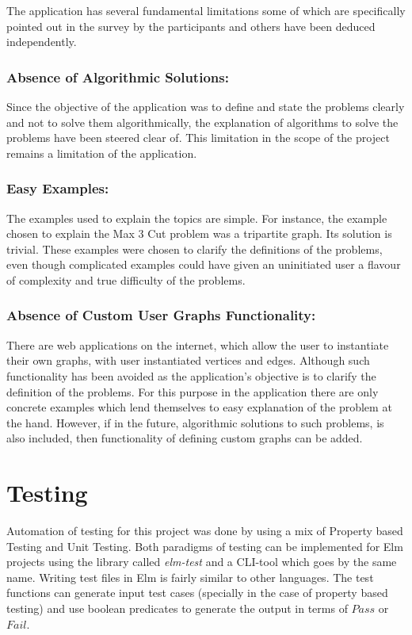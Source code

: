 The application has several fundamental limitations some of which are specifically pointed
out in the survey by the participants and others have been deduced
independently.

\subsubsection{Absence of Algorithmic Solutions:}
Since the objective of the application was to define and state the problems
clearly and not to solve them algorithmically, the explanation of algorithms to
solve the problems have been steered clear of. This limitation in the scope of
the project remains a limitation of the application.

\subsubsection{Easy Examples:}
The examples used to explain the topics are simple. For instance, the example
chosen to explain the Max 3 Cut problem was a tripartite graph.  Its solution
is trivial. These examples were chosen to clarify the definitions of the
problems, even though complicated examples could have given an uninitiated user
a flavour of complexity and true difficulty of the problems.

\subsubsection{Absence of Custom User Graphs Functionality:}
There are web applications on the internet, which allow the user to instantiate
their own graphs, with user instantiated vertices and edges. Although such
functionality has been avoided as the application's objective is to clarify the
definition of the problems. For this purpose in the application there are only
concrete examples which lend themselves to easy explanation of the problem at
the hand. However, if in the future, algorithmic solutions to such problems, is
also included, then functionality of defining custom graphs can be added.

\section{Testing}
Automation of testing for this project was done by using a mix of Property
based Testing and Unit Testing. Both paradigms of testing can be implemented
for Elm projects using the library called \emph{elm-test} and a CLI-tool which
goes by the same name. Writing test files in Elm is fairly similar to other languages. The test functions can generate input test cases (specially in
the case of property based testing) and use boolean predicates to generate the
output in terms of $Pass$ or $Fail$.

